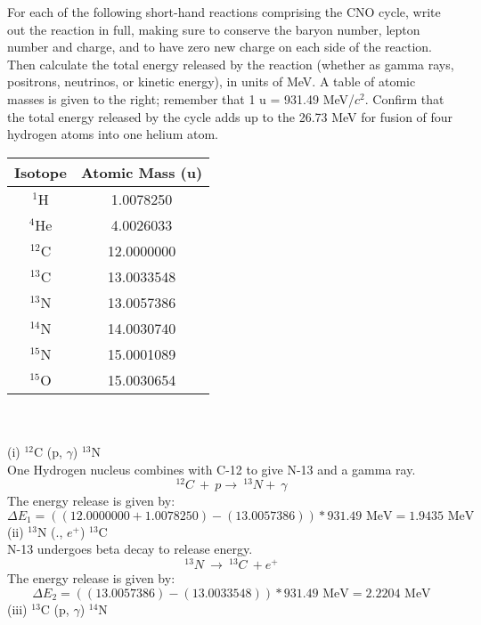 \documentclass[10pt]{article}
\begin{document}
\begin{minipage}{0.6\textwidth}
For each of the following short-hand reactions comprising the CNO cycle, write out the reaction in full, making sure to conserve the baryon number, lepton number and charge, and to have zero new charge on each side of the reaction. Then calculate the total energy released by the reaction (whether as gamma rays, positrons, neutrinos, or kinetic energy), in units of MeV. A table of atomic masses is given to the right; remember that 1 u = 931.49 MeV/$c^2$. Confirm that the total energy released by the cycle adds up to the 26.73 MeV for fusion of four hydrogen atoms into one helium atom.
\end{minipage}
\begin{minipage}{0.4\textwidth} %
    \centering
    \begin{tabular}{cc}
    Isotope & Atomic Mass (u) \\
    \midrule
    $^{\text{1}}$H & 1.0078250 \\
    $^{\text{4}}$He & 4.0026033 \\
    $^{\text{12}}$C & 12.0000000 \\
    $^{\text{13}}$C & 13.0033548 \\
    $^{\text{13}}$N & 13.0057386 \\
    $^{\text{14}}$N & 14.0030740 \\
    $^{\text{15}}$N & 15.0001089 \\
    $^{\text{15}}$O & 15.0030654 \\
    \end{tabular}
\end{minipage}
\\ \\
(i) $^{\text{12}}$C (p, $\gamma$) $^{\text{13}}$N \\
One Hydrogen nucleus combines with C-12 to give N-13 and a gamma ray.\\
\[ ^{\text{12}}C  \ +  \ p \longrightarrow  \ ^{\text{13}}N + \ \gamma \]
The energy release is given by:
\[ \Delta E_{1} = ((12.0000000 + 1.0078250) - (13.0057386))*931.49 \text{ MeV}  = 1.9435 \text{ MeV} \]
(ii) $^{\text{13}}$N (., $e^{+}$) $^{\text{13}}$C \\
N-13 undergoes beta decay to release energy.\\
\[ ^{\text{13}}N  \ \longrightarrow  \ ^{\text{13}}C \  + e^{+} \]
The energy release is given by:
\[ \Delta E_{2} = ((13.0057386) - (13.0033548))*931.49 \text{ MeV}  = 2.2204 \text{ MeV} \]
(iii) $^{\text{13}}$C (p, $\gamma$) $^{\text{14}}$N \\
\end{document}
